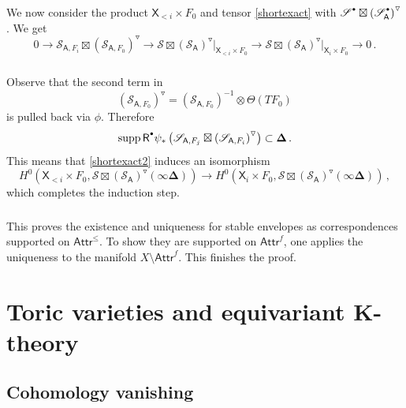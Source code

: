 \documentclass[14pt]{extarticle}
\newcommand{\cSd}{{\cS}^{\raisebox{0.5mm}{$\scriptscriptstyle \bullet$}}}
\newcommand{\Rd}{{\mathsf{R}}^{\raisebox{0.5mm}{$\scriptscriptstyle \bullet$}}}
\newcommand{\bA}{\mathsf{A}}
\newcommand{\bX}{\mathsf{X}}
\newcommand{\bDel}{\boldsymbol{\Delta}}
\newcommand{\cS}{\mathscr{S}}
\newcommand{\fAttr}{\Attr^f}
\newcommand{\Attrc}{\Attr^{\le}}
\newcommand{\Attr}{\mathsf{Attr}}
\newcommand{\dd}{\triangledown}
\DeclareMathOperator{\supp}{supp}
\theoremstyle{definition}
\begin{document}
\subsubsection{}

We now consider the product $\bX_{<i} \times F_0$ and tensor
\eqref{shortexact} with $\cSd \boxtimes
\left(\cSd_\bA\right)^\dd$. We get
%
%
  \begin{equation}
    \label{shortexact2}
    0 \to \cS_{\bA, F_i} \boxtimes  \left(\cS_{\bA, F_0}\right)^\dd
    \to \cS \boxtimes \left(\cS_\bA\right)^\dd \Big|_{\bX_{<i} \times
      F_0} \to \cS \boxtimes \left(\cS_\bA\right)^\dd \Big|_{\bX_{i} \times
      F_0}
    \to 0  \,. 
  \end{equation}

\subsubsection{}

  
  Observe that the second term in
  $$
  \left(\cS_{\bA, F_0}\right)^\dd = \left(\cS_{\bA, F_0}\right)^{-1}
  \otimes \Theta(TF_0)
  $$
  is pulled back via $\phi$. Therefore
  $$
  \supp \Rd \psi_*  \left(\cS_{\bA,F_j} \boxtimes \left(
      \cS_{\bA,F_i} \right)^\dd  \right) \subset \bDel   \,. 
  $$
  This means that \eqref{shortexact2} induces an isomorphism
  $$
  H^0( \bX_{<i} \times
  F_0, \cS \boxtimes \left(\cS_\bA\right)^\dd  (\infty \bDel))
  \to
  H^0( \bX_{i} \times
  F_0, \cS \boxtimes \left(\cS_\bA\right)^\dd  (\infty \bDel)) \,, 
  $$
  which completes the induction step.

  \subsubsection{}
  This proves the existence and uniqueness for stable envelopes as
  correspondences supported on $\Attrc$. To show they are supported on
  $\fAttr$, one applies the uniqueness to the manifold $X \setminus
  \fAttr$.  This finishes the proof. 

  \section{Toric varieties and equivariant K-theory}

  \subsection{Cohomology vanishing}\label{s_Dellam} 
\end{document}
